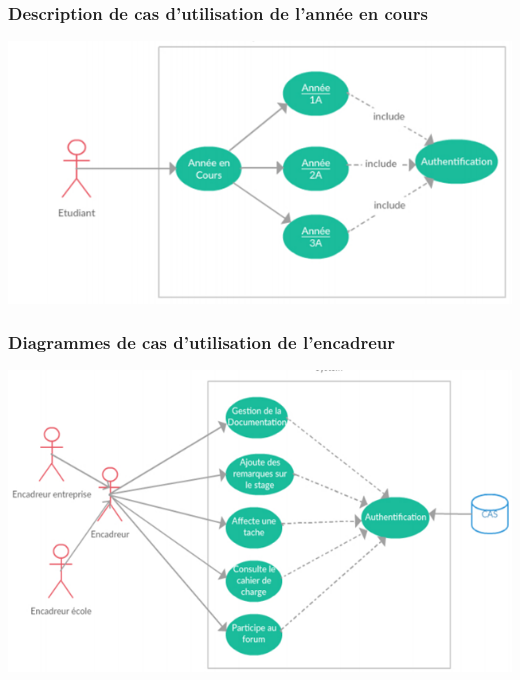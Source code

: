 \documentclass{scrreprt}
\begin{document}
\subsubsection{Description de cas d'utilisation de l'année en cours}
\begin{center}
	\includegraphics[scale=0.55]{image/descriptiondecasanneencours.png}
\end{center}
\subsubsection{Diagrammes de cas d'utilisation de l'encadreur}
\begin{center}
	\includegraphics[scale=0.55]{image/casutilisationencadreur.png}
\end{center}
\end{document}
